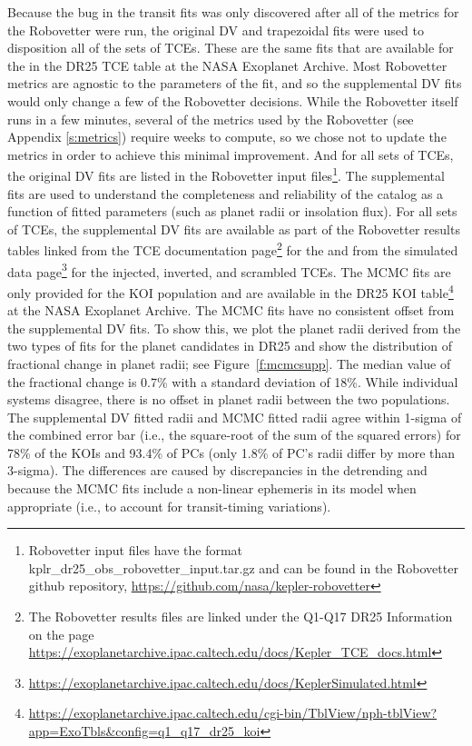 Because the bug in the transit fits was only discovered after all of the metrics for the Robovetter were run, the original DV and trapezoidal fits were used to disposition all of the sets of TCEs. These are the same fits that are available for the  in the DR25 TCE table at the NASA Exoplanet Archive. Most Robovetter metrics are agnostic to the parameters of the fit, and so the supplemental DV fits would only change a few of the Robovetter decisions. While the Robovetter itself runs in a few minutes, several of the metrics used by the Robovetter (see Appendix \ref{s:metrics}) require weeks to compute, so we chose not to update the metrics in order to achieve this minimal improvement. And for all sets of TCEs, the original DV fits are listed in the Robovetter input files\footnote{Robovetter input files have the format kplr\_dr25\_obs\_robovetter\_input.tar.gz and can be found in the Robovetter github repository, \url{https://github.com/nasa/kepler-robovetter}}. The supplemental fits are used to understand the completeness and reliability of the catalog as a function of fitted parameters (such as planet radii or insolation flux). For all sets of TCEs, the supplemental DV fits are available as part of the Robovetter results tables linked from the TCE documentation page\footnote{The Robovetter results files are linked under the Q1-Q17 DR25 Information on the page \url{https://exoplanetarchive.ipac.caltech.edu/docs/Kepler\_TCE\_docs.html}} for the  and from the simulated data page\footnote{\url{https://exoplanetarchive.ipac.caltech.edu/docs/KeplerSimulated.html}} \citep[see][]{Christiansen2017,Coughlin2017a} for the injected, inverted, and scrambled TCEs. The MCMC fits are only provided for the KOI population and are available in the DR25 KOI table\footnote{\url{https://exoplanetarchive.ipac.caltech.edu/cgi-bin/TblView/nph-tblView?app=ExoTbls\&config=q1\_q17\_dr25\_koi}} at the NASA Exoplanet Archive. The MCMC fits have no consistent offset from the supplemental DV fits.  To show this, we plot the planet radii derived from the two types of fits for the planet candidates in DR25 and show the distribution of fractional change in planet radii; see Figure~\ref{f:mcmcsupp}. The median value of the fractional change is 0.7\% with a standard deviation of 18\%. While individual systems disagree, there is no offset in planet radii between the two populations. The supplemental DV fitted radii and MCMC fitted radii agree within 1-sigma of the combined error bar (i.e., the square-root of the sum of the squared errors) for 78\% of the KOIs and 93.4\% of PCs (only 1.8\% of PC's radii differ by more than 3-sigma).  The differences are caused by discrepancies in the detrending and because the MCMC fits include a non-linear ephemeris in its model when appropriate (i.e., to account for transit-timing variations).

